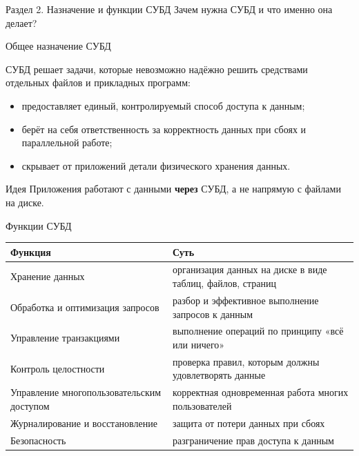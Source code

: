 \documentclass[aspectratio=169]{beamer}
\begin{document}

\begin{frame}{Раздел 2. Назначение и функции СУБД}
\centering
\Large
Зачем нужна СУБД и что именно она делает?
\end{frame}


\begin{frame}{Общее назначение СУБД}

СУБД решает задачи, которые невозможно надёжно решить
средствами отдельных файлов и прикладных программ:

\vspace{0.3cm}

\begin{itemize}
  \item предоставляет единый, контролируемый способ
        доступа к данным;
  \item берёт на себя ответственность за корректность
        данных при сбоях и параллельной работе;
  \item скрывает от приложений детали физического
        хранения данных.
\end{itemize}

\vspace{0.3cm}

\begin{block}{Идея}
Приложения работают с данными \textbf{через} СУБД,
а не напрямую с файлами на диске.
\end{block}

\end{frame}


\begin{frame}{Функции СУБД}

\small
\begin{table}
\centering
\begin{tabular}{p{}|p{}}
\toprule
\textbf{Функция} & \textbf{Суть}\\
\midrule
Хранение данных & организация данных на диске в виде таблиц, файлов, страниц\\
Обработка и оптимизация запросов & разбор и эффективное выполнение запросов к данным\\
Управление транзакциями & выполнение операций по принципу «всё или ничего»\\
Контроль целостности & проверка правил, которым должны удовлетворять данные\\
Управление многопользовательским доступом & корректная одновременная работа многих пользователей\\
Журналирование и восстановление & защита от потери данных при сбоях\\
Безопасность & разграничение прав доступа к данным\\
\bottomrule
\end{tabular}
\end{table}

\end{frame}
\end{document}
